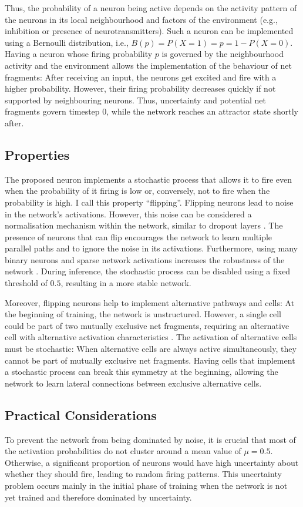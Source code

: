 Thus, the probability of a neuron being active depends on the activity pattern of the neurons in its local neighbourhood and factors of the environment (e.g., inhibition or presence of neurotransmitters).
Such a neuron can be implemented using a Bernoulli distribution, i.e., $B(p) = P(X = 1) = p = 1 - P(X=0)$. Having a neuron whose firing probability $p$ is governed by the neighbourhood activity and the environment allows the implementation of the behaviour of net fragments: After receiving an input, the neurons get excited and fire with a higher probability. However, their firing probability decreases quickly if not supported by neighbouring neurons. Thus, uncertainty and potential net fragments govern timestep 0, while the network reaches an attractor state shortly after. 

\subsection{Properties}
The proposed neuron implements a stochastic process that allows it to fire even when the probability of it firing is low or, conversely, not to fire when the probability is high.
I call this property ``flipping''.
Flipping neurons lead to noise in the network's activations.
However, this noise can be considered a normalisation mechanism within the network, similar to dropout layers .
The presence of neurons that can flip encourages the network to learn multiple parallel paths and to ignore the noise in its activations.
Furthermore, using many binary neurons and sparse network activations increases the robustness of the network .
During inference, the stochastic process can be disabled using a fixed threshold of $0.5$, resulting in a more stable network.

Moreover, flipping neurons help to implement alternative pathways and cells: At the beginning of training, the network is unstructured.
However, a single cell could be part of two mutually exclusive net fragments, requiring an alternative cell with alternative activation characteristics .
The activation of alternative cells must be stochastic:
When alternative cells are always active simultaneously, they cannot be part of mutually exclusive net fragments.
Having cells that implement a stochastic process can break this symmetry at the beginning, allowing the network to learn lateral connections between exclusive alternative cells.

\subsection{Practical Considerations}
To prevent the network from being dominated by noise, it is crucial that most of the activation probabilities do not cluster around a mean value of $\mu = 0.5$. Otherwise, a significant proportion of neurons would have high uncertainty about whether they should fire, leading to random firing patterns. This uncertainty problem occurs mainly in the initial phase of training when the network is not yet trained and therefore dominated by uncertainty.

